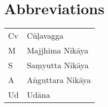 \chapter*{Abbreviations}

\begin{tabular}{l l}
Cv & Cūḷavagga\\
M & Majjhima Nikāya\\
S & Saṃyutta Nikāya\\
A & Aṅguttara Nikāya\\
Ud & Udāna\\
\end{tabular}
